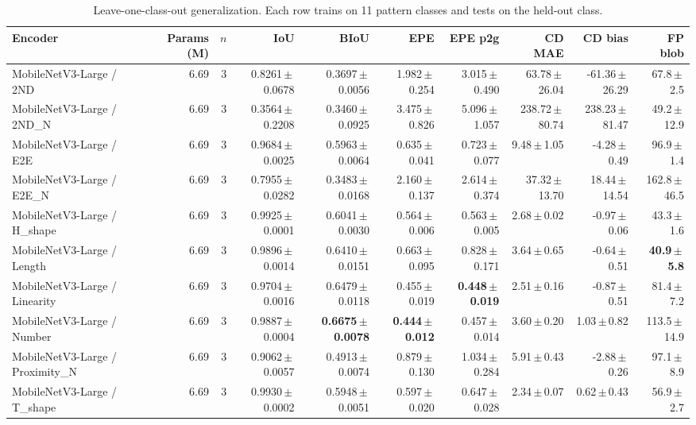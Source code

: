 \begin{table}[t]
\centering
\small
\caption{Leave-one-class-out generalization. Each row trains on 11 pattern classes and tests on the held-out class.}
\label{tab:loco}
\begin{tabular}{l r r r r r r r r r}
\toprule
Encoder & Params (M) & $n$ & IoU & BIoU & EPE & EPE p2g & CD MAE & CD bias & FP blob \\
\midrule
MobileNetV3-Large / 2ND & 6.69 & 3 & 0.8261\,$\pm$\,0.0678 & 0.3697\,$\pm$\,0.0056 & 1.982\,$\pm$\,0.254 & 3.015\,$\pm$\,0.490 & 63.78\,$\pm$\,26.04 & -61.36\,$\pm$\,26.29 & 67.8\,$\pm$\,2.5 \\
MobileNetV3-Large / 2ND_N & 6.69 & 3 & 0.3564\,$\pm$\,0.2208 & 0.3460\,$\pm$\,0.0925 & 3.475\,$\pm$\,0.826 & 5.096\,$\pm$\,1.057 & 238.72\,$\pm$\,80.74 & 238.23\,$\pm$\,81.47 & 49.2\,$\pm$\,12.9 \\
MobileNetV3-Large / E2E & 6.69 & 3 & 0.9684\,$\pm$\,0.0025 & 0.5963\,$\pm$\,0.0064 & 0.635\,$\pm$\,0.041 & 0.723\,$\pm$\,0.077 & 9.48\,$\pm$\,1.05 & -4.28\,$\pm$\,0.49 & 96.9\,$\pm$\,1.4 \\
MobileNetV3-Large / E2E_N & 6.69 & 3 & 0.7955\,$\pm$\,0.0282 & 0.3483\,$\pm$\,0.0168 & 2.160\,$\pm$\,0.137 & 2.614\,$\pm$\,0.374 & 37.32\,$\pm$\,13.70 & 18.44\,$\pm$\,14.54 & 162.8\,$\pm$\,46.5 \\
MobileNetV3-Large / H_shape & 6.69 & 3 & 0.9925\,$\pm$\,0.0001 & 0.6041\,$\pm$\,0.0030 & 0.564\,$\pm$\,0.006 & 0.563\,$\pm$\,0.005 & 2.68\,$\pm$\,0.02 & -0.97\,$\pm$\,0.06 & 43.3\,$\pm$\,1.6 \\
MobileNetV3-Large / Length & 6.69 & 3 & 0.9896\,$\pm$\,0.0014 & 0.6410\,$\pm$\,0.0151 & 0.663\,$\pm$\,0.095 & 0.828\,$\pm$\,0.171 & 3.64\,$\pm$\,0.65 & -0.64\,$\pm$\,0.51 & \textbf{40.9\,$\pm$\,5.8} \\
MobileNetV3-Large / Linearity & 6.69 & 3 & 0.9704\,$\pm$\,0.0016 & 0.6479\,$\pm$\,0.0118 & 0.455\,$\pm$\,0.019 & \textbf{0.448\,$\pm$\,0.019} & 2.51\,$\pm$\,0.16 & -0.87\,$\pm$\,0.51 & 81.4\,$\pm$\,7.2 \\
MobileNetV3-Large / Number & 6.69 & 3 & 0.9887\,$\pm$\,0.0004 & \textbf{0.6675\,$\pm$\,0.0078} & \textbf{0.444\,$\pm$\,0.012} & 0.457\,$\pm$\,0.014 & 3.60\,$\pm$\,0.20 & 1.03\,$\pm$\,0.82 & 113.5\,$\pm$\,14.9 \\
MobileNetV3-Large / Proximity_N & 6.69 & 3 & 0.9062\,$\pm$\,0.0057 & 0.4913\,$\pm$\,0.0074 & 0.879\,$\pm$\,0.130 & 1.034\,$\pm$\,0.284 & 5.91\,$\pm$\,0.43 & -2.88\,$\pm$\,0.26 & 97.1\,$\pm$\,8.9 \\
MobileNetV3-Large / T_shape & 6.69 & 3 & 0.9930\,$\pm$\,0.0002 & 0.5948\,$\pm$\,0.0051 & 0.597\,$\pm$\,0.020 & 0.647\,$\pm$\,0.028 & 2.34\,$\pm$\,0.07 & 0.62\,$\pm$\,0.43 & 56.9\,$\pm$\,2.7 \\

\end{tabular}
\end{table}

